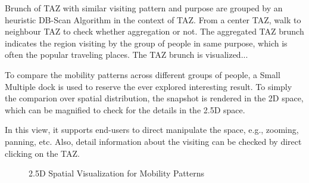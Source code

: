 Brunch of TAZ with similar visiting pattern and purpose are grouped by an heuristic DB-Scan Algorithm in the context of TAZ. From a center TAZ, walk to neighbour TAZ to check whether aggregation or not. The aggregated TAZ brunch indicates the region visiting by the group of people in same purpose, which is often the popular traveling places. The TAZ brunch is visualized...

 To compare the mobility patterns across different groups of people, a Small Multiple dock is used to reserve the ever explored interesting result. To simply the comparion over spatial distribution, the snapshot is rendered in the 2D space, which can be magnified to check for the details in the 2.5D space.

 In this view, it supports end-users to direct manipulate the space, e.g., zooming, panning, etc. Also, detail information about the visiting can be checked by direct clicking on the TAZ. 

\begin{figure}
\centering
{}\hspace{5pt}
\hspace{5pt}
\caption{2.5D Spatial Visualization for Mobility Patterns}
\label{fig:2.5D}
\end{figure}